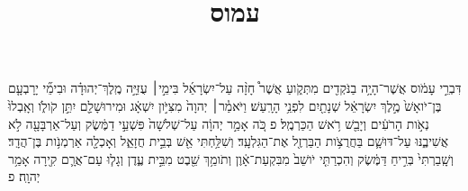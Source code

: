 \documentclass{openreader}
\title{עמוס}
\date{}
\begin{document}
\maketitle
\raggedbottom 
\fontsize{16pt}{24pt}\selectfont


דִּבְרֵ֣י עָמֹ֔וס אֲשֶׁר־הָיָ֥ה בַנֹּקְדִ֖ים מִתְּקֹ֑ועַ אֲשֶׁר֩ חָזָ֨ה עַל־יִשְׂרָאֵ֜ל בִּימֵ֣י׀ עֻזִּיָּ֣ה מֶֽלֶךְ־יְהוּדָ֗ה וּבִימֵ֞י יָרָבְעָ֤ם בֶּן־יֹואָשׁ֙ מֶ֣לֶךְ יִשְׂרָאֵ֔ל שְׁנָתַ֖יִם לִפְנֵ֥י הָרָֽעַשׁ׃ 
וַיֹּאמַ֓ר׀ יְהוָה֙ מִצִּיֹּ֣ון יִשְׁאָ֔ג וּמִירוּשָׁלִַ֖ם יִתֵּ֣ן קֹולֹ֑ו וְאָֽבְלוּ֙ נְאֹ֣ות הָרֹעִ֔ים וְיָבֵ֖שׁ רֹ֥אשׁ הַכַּרְמֶֽל׃ פ 
כֹּ֚ה אָמַ֣ר יְהוָ֔ה עַל־שְׁלֹשָׁה֙ פִּשְׁעֵ֣י דַמֶּ֔שֶׂק וְעַל־אַרְבָּעָ֖ה לֹ֣א אֲשִׁיבֶ֑נּוּ עַל־דּוּשָׁ֛ם בַּחֲרֻצֹ֥ות הַבַּרְזֶ֖ל אֶת־הַגִּלְעָֽד׃ 
וְשִׁלַּ֥חְתִּי אֵ֖שׁ בְּבֵ֣ית חֲזָאֵ֑ל וְאָכְלָ֖ה אַרְמְנֹ֥ות בֶּן־הֲדָֽד׃ 
וְשָֽׁבַרְתִּי֙ בְּרִ֣יחַ דַּמֶּ֔שֶׂק וְהִכְרַתִּ֤י יֹושֵׁב֙ מִבִּקְעַת־אָ֔וֶן וְתֹומֵ֥ךְ שֵׁ֖בֶט מִבֵּ֣ית עֶ֑דֶן וְגָל֧וּ עַם־אֲרָ֛ם קִ֖ירָה אָמַ֥ר יְהוָֽה׃ פ 
\end{document}
